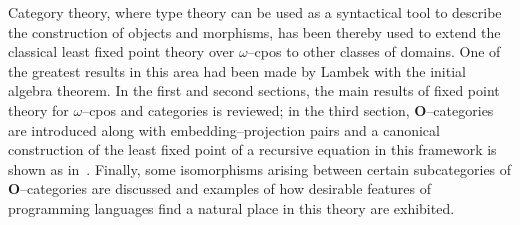 Category theory, where type theory can be used as a syntactical tool to describe the construction of objects and morphisms, has been thereby used to extend the classical least fixed point theory over \(\omega\)--cpos to other classes of domains. One of the greatest results in this area had been made by Lambek with the initial algebra theorem.
%
%
In the first and second sections, the main results of fixed point theory for \(\omega\)--cpos and categories is reviewed; in the third section, \(\mathbf{O}\)--categories are introduced along with embedding--projection pairs and a canonical construction of the least fixed point of a recursive equation in this framework is shown as in~\cite{Smyth1982}.
Finally, some isomorphisms arising between certain subcategories of \(\mathbf{O}\)--categories are discussed and examples of how desirable features of programming languages find a natural place in this theory are exhibited.
%
